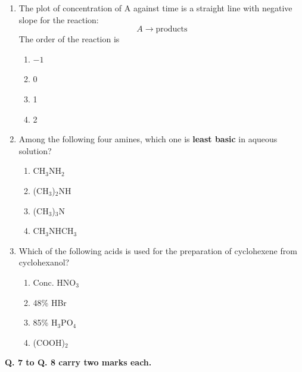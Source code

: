 \documentclass[journal,12pt,onecolumn]{IEEEtran}
\begin{document}
\begin{enumerate}
    \item The plot of concentration of A against time is a straight line with negative slope for the reaction:  
    \[
    A \longrightarrow \text{products}
    \]  
    The order of the reaction is  
    \begin{multicols}{2}
    \begin{enumerate}[label=(\Alph*)]
        \item $-1$  
        \item 0  
        \item 1  
        \item 2  
    \end{enumerate}
    \end{multicols}

    \item Among the following four amines, which one is \textbf{least basic} in aqueous solution?  
    \begin{multicols}{2}
    \begin{enumerate}[label=(\Alph*)]
        \item CH$_3$NH$_2$  
        \item (CH$_3$)$_2$NH  
        \item (CH$_3$)$_3$N  
        \item CH$_3$NHCH$_3$  
    \end{enumerate}
    \end{multicols}

    \item Which of the following acids is used for the preparation of cyclohexene from cyclohexanol?  
    \begin{multicols}{2}
    \begin{enumerate}[label=(\Alph*)]
        \item Conc. HNO$_3$  
        \item 48\% HBr  
        \item 85\% H$_3$PO$_4$  
        \item (COOH)$_2$  
    \end{enumerate}
    \end{multicols}
\end{enumerate}

\noindent\textbf{Q. 7 to Q. 8 carry two marks each.}
\end{document}
